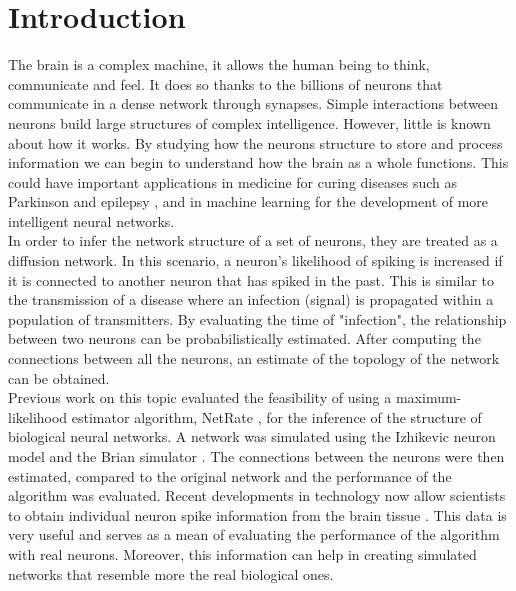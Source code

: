 
\chapter{Introduction}

The brain is a complex machine, it allows the human being to think, communicate and feel. It does so thanks to the billions of neurons that communicate in a dense network through synapses. Simple interactions between neurons build large structures of complex intelligence. However, little is known about how it works. By studying how the neurons structure to store and process information we can begin to understand how the brain as a whole functions. This could have important applications in medicine for curing diseases such as Parkinson \cite{OldeDubbelinkKimT.E.2014Dbnt} and epilepsy \cite{PONTEN2007918}, and in machine learning for the development of more intelligent neural networks.\\

In order to infer the network structure of a set of neurons, they are treated as a diffusion network. In this scenario, a neuron's likelihood of spiking is increased if it is connected to another neuron that has spiked in the past. This is similar to the transmission of a disease where an infection (signal) is propagated within a population of transmitters. By evaluating the time of "infection", the relationship between two neurons can be probabilistically estimated. After computing the connections between all the neurons, an estimate of the topology of the network can be obtained. \\

Previous work on this topic \cite{pranav_report, alexandru2018estimating} evaluated the feasibility of using a maximum-likelihood estimator algorithm, NetRate \cite{rodriguez2011uncovering}, for the inference of the structure of biological neural networks. A network was simulated using the Izhikevic neuron model \cite{izhikevich2003simple} and the Brian simulator \cite{10.3389/neuro.01.026.2009}. The connections between the neurons were then estimated, compared to the original network and the performance of the algorithm was evaluated. Recent developments in technology now allow scientists to obtain individual neuron spike information from the brain tissue \cite{ito2016spontaneous, ito2014large, litke2004does}. This data is very useful and serves as a mean of evaluating the performance of the algorithm with real neurons. Moreover, this information can help in creating simulated networks that resemble more the real biological ones.

